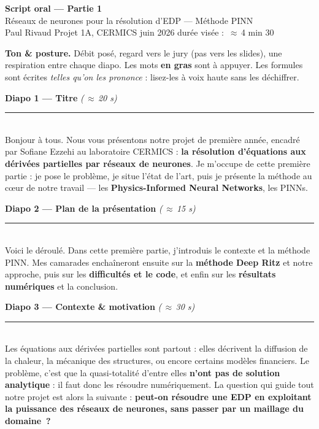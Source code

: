 \documentclass[11pt]{article}
\newcommand{\diapo}[3]{%
  \vspace{10pt}%
  {\sffamily\bfseries\color{bblue}\large Diapo #1 — #2}%
  \hfill{\sffamily\small\color{dblue}\itshape (#3)}\\[-2pt]
  {\color{bblue}\rule{\linewidth}{0.8pt}}\\[4pt]}
\newcommand{\key}[1]{\textbf{#1}}
\begin{document}
\begin{center}
  {\sffamily\bfseries\color{dblue}\Large Script oral — Partie 1}\\[3pt]
  {\sffamily\color{bblue} Réseaux de neurones pour la résolution d'EDP — Méthode PINN}\\[6pt]
  {\small Paul Rivaud \;\textbullet\; Projet 1A, CERMICS \;\textbullet{} juin 2026
  \;\textbullet\; durée visée : \,$\approx$\,4 min 30}
\end{center}
\vspace{4pt}

\begin{tcolorbox}[colback=lblue,colframe=bblue,boxrule=0.8pt,arc=3pt,
  left=8pt,right=8pt,top=5pt,bottom=5pt]
  {\sffamily\bfseries\color{dblue}Ton \& posture.} Débit posé, regard vers le jury
  (pas vers les slides), une respiration entre chaque diapo. Les mots
  \key{en gras} sont à appuyer. Les formules sont écrites \emph{telles qu'on les
  prononce} : lisez-les à voix haute sans les déchiffrer.
\end{tcolorbox}

\diapo{1}{Titre}{\,$\approx$\,20 s}
Bonjour à tous. Nous vous présentons notre projet de première année, encadré par
Sofiane Ezzehi au laboratoire CERMICS : \key{la résolution d'équations aux
dérivées partielles par réseaux de neurones}. Je m'occupe de cette première
partie : je pose le problème, je situe l'état de l'art, puis je présente la
méthode au cœur de notre travail — les \key{Physics-Informed Neural Networks},
les PINNs.

\diapo{2}{Plan de la présentation}{\,$\approx$\,15 s}
Voici le déroulé. Dans cette première partie, j'introduis le contexte et la
méthode PINN. Mes camarades enchaîneront ensuite sur la \key{méthode Deep Ritz}
et notre approche, puis sur les \key{difficultés et le code}, et enfin sur les
\key{résultats numériques} et la conclusion.

\diapo{3}{Contexte \& motivation}{\,$\approx$\,30 s}
Les équations aux dérivées partielles sont partout : elles décrivent la diffusion
de la chaleur, la mécanique des structures, ou encore certains modèles
financiers. Le problème, c'est que la quasi-totalité d'entre elles \key{n'ont pas
de solution analytique} : il faut donc les résoudre numériquement. La question
qui guide tout notre projet est alors la suivante : \key{peut-on résoudre une EDP
en exploitant la puissance des réseaux de neurones, sans passer par un maillage du
domaine~?}
\end{document}
